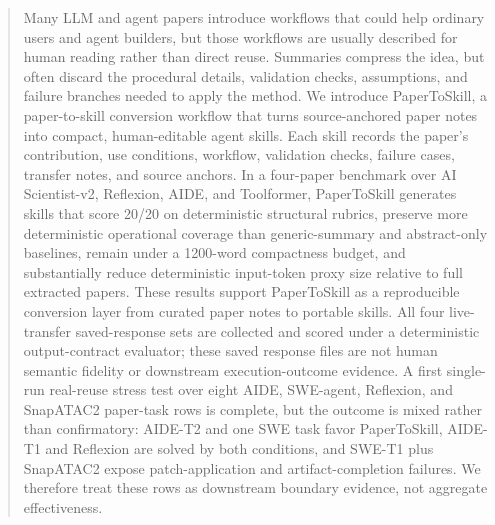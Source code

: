 \begin{abstract}
Many LLM and agent papers introduce workflows that could help ordinary users and
agent builders, but those workflows are usually described for human reading
rather than direct reuse. Summaries compress the idea, but often discard the
procedural details, validation checks, assumptions, and failure branches needed
to apply the method. We introduce PaperToSkill, a paper-to-skill conversion
workflow that turns source-anchored paper notes into compact, human-editable
agent skills. Each skill records the paper's contribution, use conditions,
workflow, validation checks, failure cases, transfer notes, and source anchors.
In a four-paper benchmark over AI Scientist-v2, Reflexion, AIDE, and
Toolformer, PaperToSkill generates skills that score 20/20 on deterministic
structural rubrics, preserve more deterministic operational coverage than
generic-summary and abstract-only baselines, remain under a 1200-word
compactness budget, and substantially reduce deterministic input-token proxy
size relative to full extracted papers. These results support PaperToSkill as a
reproducible conversion layer from curated paper notes to portable skills. All
four live-transfer saved-response sets are collected and scored under a
deterministic output-contract evaluator; these saved response files are not
human semantic fidelity or downstream execution-outcome evidence. A first
single-run real-reuse stress test over eight AIDE, SWE-agent, Reflexion, and
SnapATAC2 paper-task rows is complete, but the outcome is mixed rather than
confirmatory: AIDE-T2 and one SWE task favor PaperToSkill, AIDE-T1 and
Reflexion are solved by both conditions, and SWE-T1 plus SnapATAC2 expose
patch-application and artifact-completion failures. We therefore treat these
rows as downstream boundary evidence, not aggregate effectiveness.
\end{abstract}

